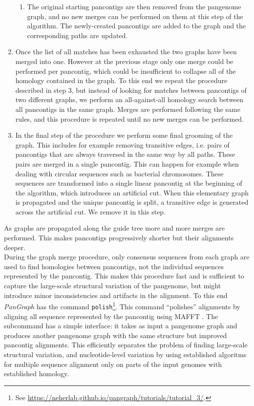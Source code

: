 \documentclass[aps,rmp,reprint,superscriptaddress,notitlepage,10pt,onecolumn]{revtex4-1}
\begin{document}
\begin{enumerate}
\begin{enumerate}
              \item The original starting pancontigs are then removed from the pangenome graph, and no new merges can be performed on them at this step of the algorithm. The newly-created pancontigs are added to the graph and the corresponding paths are updated.
          \end{enumerate}
    \item Once the list of all matches has been exhausted the two graphs have been merged into one. However at the previous stage only one merge could be performed per pancontig, which could be insufficient to collapse all of the homology contained in the graph. To this end we repeat the procedure described in step 3, but instead of looking for matches between pancontigs of two different graphs, we perform an all-against-all homology search between all pancontigs in the same graph. Merges are performed following the same rules, and this procedure is repeated until no new merges can be performed.
    \item In the final step of the procedure we perform some final grooming of the graph. This includes for example removing transitive edges, i.e. pairs of pancontigs that are always traversed in the same way by all paths. These pairs are merged in a single pancontig. This can happen for example when dealing with circular sequences such as bacterial chromosomes. These sequences are transformed into a single linear pancontig at the beginning of the algorithm, which introduces an artificial cut. When this elementary graph is propagated and the unique pancontig is split, a transitive edge is generated across the artificial cut. We remove it in this step.
\end{enumerate}

As graphs are propagated along the guide tree more and more merges are performed. This makes pancontigs progressively shorter but their alignments deeper.\\

During the graph merge procedure, only consensus sequences from each graph are used to find homologies between pancontigs, not the individual sequences represented by the pancontig. 
This makes this procedure fast and is sufficient to capture the large-scale structural variation of the pangenome, but might introduce minor inconsistencies and artifacts in the alignment. To this end \textit{PanGraph} has the command \verb|polish|\footnote{See \url{https://neherlab.github.io/pangraph/tutorials/tutorial_3/}.}. This command ``polishes'' alignments by aligning all sequence represented by the pancontig using MAFFT \cite{katoh2002mafft}. 
The subcommand has a simple interface: it takes as input a pangenome graph and produces another pangenome graph with the same structure but improved pancontig alignments. This efficiently separates the problem of finding large-scale structural variation, and nucleotide-level variation by using established algoritms for multiple sequence alignment only on parts of the input genomes with established homology.
\end{document}
